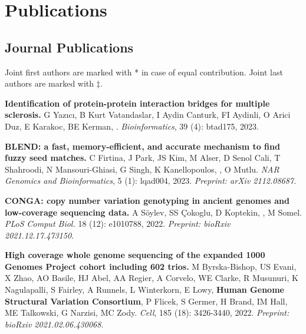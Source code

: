 \section{\sc Publications}
                                       
                                       \vspace{-0.5cm}
                                       
                                       \subsection{\small \sc Journal Publications}
                                       \vspace{-0.6cm}
                                       
                                       \small{
                                         Joint first authors are marked with * in case of equal contribution. Joint last authors are marked with $\ddag$.
                                       }

\vspace{-.2cm}
{\bf Identification of protein-protein interaction bridges for multiple sclerosis.} G Yazıcı, B Kurt Vatandaslar, I Aydin Canturk, FI Aydinli, O Arici Duz, E Karakoc, BE Kerman, \calkan{}. {\it Bioinformatics}, 39 (4): btad175, 2023.

\vspace{-.2cm}
{\bf BLEND: a fast, memory-efficient, and accurate mechanism to find fuzzy seed matches.}
C Firtina, J Park, JS Kim, M Alser, D Senol Cali, T Shahroodi, N Mansouri-Ghiasi, G Singh, K Kanellopoulos, \calkan{}, O Mutlu. {\it NAR Genomics and Bioinformatics}, 5 (1): lqad004, 2023.
\textit{Preprint: arXiv 2112.08687.}

\vspace{-.2cm}
{\bf CONGA: copy number variation genotyping in ancient genomes and low-coverage sequencing data.}  A Söylev, SS Çokoglu, D Koptekin, \calkan{}, M Somel.  
{\it PLoS Comput Biol.} 18 (12): e1010788, 2022.
\textit{Preprint: bioRxiv 2021.12.17.473150.}

\vspace{-.2cm}
{\bf High coverage whole genome sequencing of the expanded 1000 Genomes Project cohort including 602 trios.}  M Byrska-Bishop, US Evani, X Zhao, AO Basile, HJ Abel, AA Regier, A Corvelo, WE Clarke, R Musunuri, K Nagulapalli, S Fairley, A Runnels, L Winterkorn, E Lowy, \textbf{Human Genome Structural Variation Consortium}, P Flicek, S Germer, H Brand, IM Hall, ME Talkowski,  G Narzisi, MC Zody. {\it Cell}, 185 (18): 3426-3440, 2022.
\textit{Preprint: bioRxiv 2021.02.06.430068}.\\
\hspace*{1cm}
          {\footnotesize \em {}}



